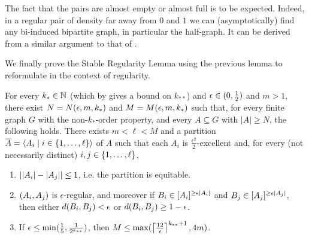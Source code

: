         \begin{remark}
            The fact that the pairs are almost empty or almost full is to be expected.
            Indeed, in a regular pair of density far away from $0$ and $1$ we can (asymptotically) find any bi-induced
            bipartite graph, in particular the half-graph.
            It can be derived from a similar argument to that of .
        \end{remark}

        We finally prove the Stable Regularity Lemma using the previous lemma to reformulate
         in the context of regularity.

        \begin{theorem} \label{thm:existance_of_regular_partitions}
            For every $k_* \in \mathbb{N}$ (which by  gives a bound on $k_{**}$) and
            $\epsilon \in ( 0, \frac{1}{2} )$ and $m > 1$, there exist $N = N( \epsilon, m, k_* )$
            and $M = M( \epsilon, m, k_* )$ such that, for every finite graph $G$ with the non-$k_{*}$-order property,
            and every $A \subseteq G$ with $|A| \geq N$, the following holds.
            There exists $m < \ell < M$ and a partition
            $\overline{A} = \left< A_i \mid i \in \{ 1, \dots, \ell \} \right>$ of $A$ such that each $A_i$ is
            $\frac{\epsilon^2}{2}$-excellent and, for every (not necessarily distinct) $i, j \in \{ 1, \dots, \ell \}$,
            \begin{enumerate}
                \item \label{itm:existance_of_regular_partitions.1} $| | A_i |- | A_j | | \leq 1$,
                    i.e. the partition is equitable.
                \item \label{itm:existance_of_regular_partitions.2} $( A_i, A_j )$ is $\epsilon$-regular, and moreover if
                    $B_i \in [ A_i ]^{\geq \epsilon | A_i |}$ and $B_j \in [ A_j ]^{\geq \epsilon | A_j |}$,
                    then either $d( B_i, B_j ) < \epsilon$ or $d( B_i, B_j ) \geq 1 - \epsilon$.
                \item \label{itm:existance_of_regular_partitions.3} If $\epsilon \leq \min ( \frac{1}{5}, \frac{1}{2^{k_{**}}} )$, then
                    $M \leq \max ( \left\lceil \frac{12}{\epsilon} \right\rceil^{k_{**}+1}, 4m )$.

\end{enumerate}
\end{theorem}
